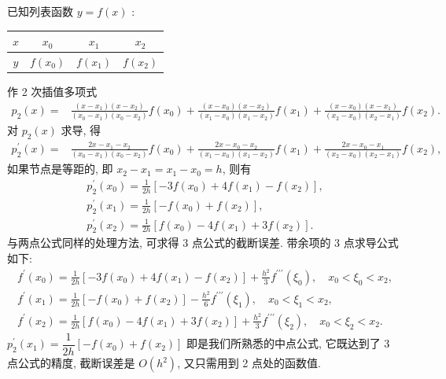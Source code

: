 已知列表函数 $ y=f(x) $ :
\begin{tabular}{c|ccc}
$ x $ & $ x_{0} $ & $ x_{1} $ & $ x_{2} $ \\
\hline$ y $ & $ f\left(x_{0}\right) $ & $ f\left(x_{1}\right) $ & $ f\left(x_{2}\right) $
\end{tabular}
作 2 次插值多项式
$$
\begin{aligned}
p_{2}(x)= & \frac{\left(x-x_{1}\right)\left(x-x_{2}\right)}{\left(x_{0}-x_{1}\right)\left(x_{0}-x_{2}\right)} f\left(x_{0}\right)+\frac{\left(x-x_{0}\right)\left(x-x_{2}\right)}{\left(x_{1}-x_{0}\right)\left(x_{1}-x_{2}\right)} f\left(x_{1}\right)  +\frac{\left(x-x_{0}\right)\left(x-x_{1}\right)}{\left(x_{2}-x_{0}\right)\left(x_{2}-x_{1}\right)} f\left(x_{2}\right) .
\end{aligned}
$$
对 $ p_{2}(x) $ 求导, 得
$$
\begin{aligned}
p_{2}^{\prime}(x)= & \frac{2 x-x_{1}-x_{2}}{\left(x_{0}-x_{1}\right)\left(x_{0}-x_{2}\right)} f\left(x_{0}\right)+\frac{2 x-x_{0}-x_{2}}{\left(x_{1}-x_{0}\right)\left(x_{1}-x_{2}\right)} f\left(x_{1}\right)  +\frac{2 x-x_{0}-x_{1}}{\left(x_{2}-x_{0}\right)\left(x_{2}-x_{1}\right)} f\left(x_{2}\right),
\end{aligned}
$$
如果节点是等距的, 即 $ x_{2}-x_{1}=x_{1}-x_{0}=h $, 则有
$$
\begin{array}{l}
p_{2}^{\prime}\left(x_{0}\right)=\frac{1}{2 h}\left[-3 f\left(x_{0}\right)+4 f\left(x_{1}\right)-f\left(x_{2}\right)\right], \\
p_{2}^{\prime}\left(x_{1}\right)=\frac{1}{2 h}\left[-f\left(x_{0}\right)+f\left(x_{2}\right)\right], \\
p_{2}^{\prime}\left(x_{2}\right)=\frac{1}{2 h}\left[f\left(x_{0}\right)-4 f\left(x_{1}\right)+3 f\left(x_{2}\right)\right] .
\end{array}
$$
与两点公式同样的处理方法, 可求得 3 点公式的截断误差. 带余项的 3 点求导公式如下:
$$
\begin{array}{l}
f^{\prime}\left(x_{0}\right)=\frac{1}{2 h}\left[-3 f\left(x_{0}\right)+4 f\left(x_{1}\right)-f\left(x_{2}\right)\right]+\frac{h^{2}}{3} f^{\prime \prime \prime}\left(\xi_{0}\right), \quad x_{0}<\xi_{0}<x_{2}, \\
f^{\prime}\left(x_{1}\right)=\frac{1}{2 h}\left[-f\left(x_{0}\right)+f\left(x_{2}\right)\right]-\frac{h^{2}}{6} f^{\prime \prime \prime}\left(\xi_{1}\right), \quad x_{0}<\xi_{1}<x_{2}, \\
f^{\prime}\left(x_{2}\right)=\frac{1}{2 h}\left[f\left(x_{0}\right)-4 f\left(x_{1}\right)+3 f\left(x_{2}\right)\right]+\frac{h^{2}}{3} f^{\prime \prime \prime}\left(\xi_{2}\right), \quad x_{0}<\xi_{2}<x_{2} .
\end{array}
$$
$p_{2}^{\prime}\left(x_{1}\right)=\dfrac{1}{2 h}\left[-f\left(x_{0}\right)+f\left(x_{2}\right)\right]$ 即是我们所熟悉的中点公式, 它既达到了 3 点公式的精度, 截断误差是 $ O\left(h^{2}\right) $, 又只需用到 2 点处的函数值. 

